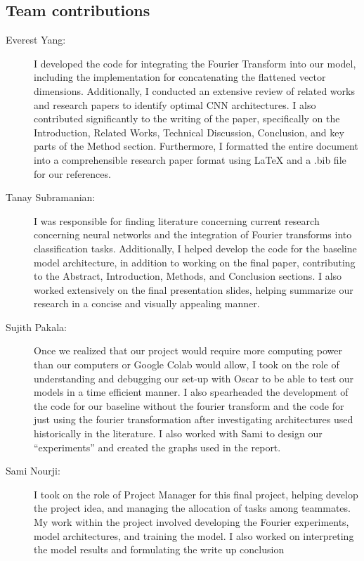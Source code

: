 \subsection*{Team contributions}

\vspace{0.1cm}

\begin{description}

\item[Everest Yang:] I developed the code for integrating the Fourier Transform into our model, including the implementation for concatenating the flattened vector dimensions. Additionally, I conducted an extensive review of related works and research papers to identify optimal CNN architectures. I also contributed significantly to the writing of the paper, specifically on the Introduction, Related Works, Technical Discussion, Conclusion, and key parts of the Method section. Furthermore, I formatted the entire document into a comprehensible research paper format using LaTeX and a .bib file for our references.

\item[Tanay Subramanian:] I was responsible for finding literature concerning current research concerning neural networks and the integration of Fourier transforms into classification tasks. Additionally, I helped develop the code for the baseline model architecture, in addition to working on the final paper, contributing to the Abstract, Introduction, Methods, and Conclusion sections. I also worked extensively on the final presentation slides, helping summarize our research in a concise and visually appealing manner.

\item[Sujith Pakala:] Once we realized that our project would require more computing power than our computers or Google Colab would allow, I took on the role of understanding and debugging our set-up with Oscar to be able to test our models in a time efficient manner. I also spearheaded the development of the code for our baseline without the fourier transform and the code for just using the fourier transformation after investigating architectures used historically in the literature. I also worked with Sami to design our “experiments” and created the graphs used in the report. 

\item[Sami Nourji:] I took on the role of Project Manager for this final project, helping develop the project idea, and managing the allocation of tasks among teammates. My work within the project involved developing the Fourier experiments, model architectures, and training the model. I also worked on interpreting the model results and formulating the write up conclusion



\end{description}


